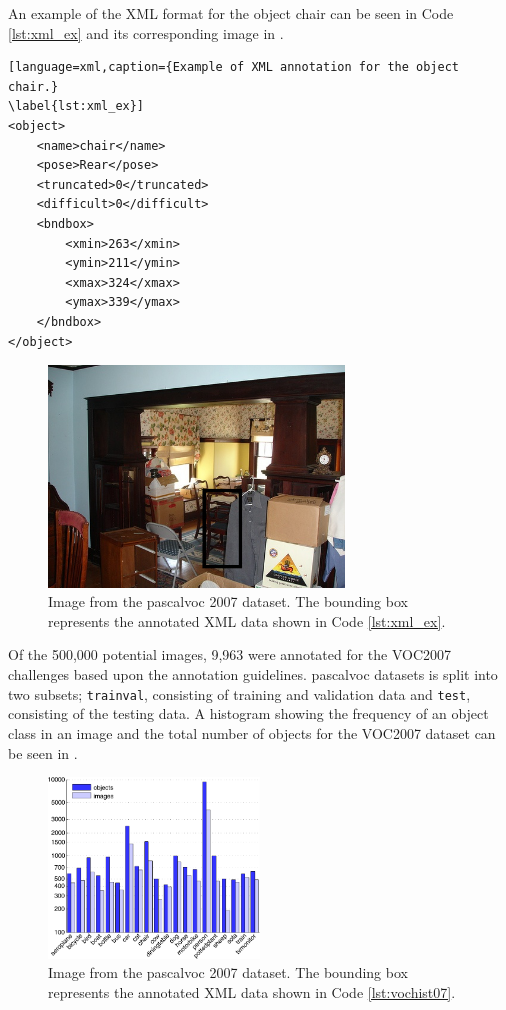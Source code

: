 An example of the XML format for the object chair can be seen in Code \ref{lst:xml_ex} and its corresponding image in . 

\begin{lstlisting}[language=xml,caption={Example of XML annotation for the object chair.}
\label{lst:xml_ex}]
<object>
    <name>chair</name>
    <pose>Rear</pose>
    <truncated>0</truncated>
	<difficult>0</difficult>
	<bndbox>
		<xmin>263</xmin>
		<ymin>211</ymin>
		<xmax>324</xmax>
		<ymax>339</ymax>
	</bndbox>
</object>
\end{lstlisting}

\begin{figure}[H]
  \centering
    \includegraphics[width=0.7\textwidth]{Figs/Techanal/000005.jpg}
    \caption{Image from the \gls{pascalvoc} 2007 dataset. The bounding box represents the annotated XML data shown in Code \ref{lst:xml_ex}.}
    \label{fig:xml_eximg}
\end{figure}

Of the 500,000 potential images, 9,963 were annotated for the VOC2007 challenges based upon the annotation guidelines. \gls{pascalvoc} datasets is split into two subsets; \lstinline{trainval}, consisting of training and validation data and \lstinline{test}, consisting of the testing data. A histogram showing the frequency of an object class in an image and the total number of objects for the VOC2007 dataset can be seen in .

\begin{figure}[H]
  \centering
    \includegraphics[width=0.5\textwidth]{Figs/Techanal/vochist07.png}
    \caption{Image from the \gls{pascalvoc} 2007 dataset. The bounding box represents the annotated XML data shown in Code \ref{lst:vochist07}.}
    \label{fig:vochist07}
\end{figure}


